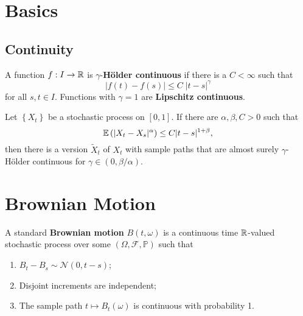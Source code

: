\documentclass[twoside,10pt]{report}
\begin{document}
\tableofcontents


\chapter{Basics}



\section{Continuity}

\begin{defn}[]
A function $f:I\to \mathbb{R}$ is $\gamma$-\textbf{H\"older continuous} if there is a $C < \infty$ such that
\[
|f(t) - f(s)| \leq C \; |t-s|^{\gamma}
\] for all $s,t \in I$. Functions with $\gamma=1$ are \textbf{Lipschitz continuous}.
\end{defn}

\begin{thrm}
	Let $\left\{ X_{t} \right\}$ be a stochastic process on $[0,1]$. If there are $\alpha,\beta,C>0$ such that
	\[
	\mathbb{E} \left(  |X_{t}-X_{s}|^{\alpha}  \right) \leq C |t-s|^{1+\beta},
	\] then there is a version $\tilde{X}_{t}$ of $X_{t}$ with sample paths that are almost surely $\gamma$-H\"older continuous for $\gamma \in (0, \beta/\alpha)$.
\end{thrm}




\chapter{Brownian Motion}

\begin{defn}[]
A standard \textbf{Brownian motion} $B(t,\omega)$ is a continuous time $\mathbb{R}$-valued stochastic process over some $(\Omega,\mathcal{F},\mathbb{P})$ such that
\begin{enumerate}
	\item $B_{t}-B_{s}\sim \mathcal{N}(0, t-s)$;
	\item Disjoint increments are independent;
	\item The sample path $t \mapsto B_{t}(\omega)$ is continuous with probability 1.
\end{enumerate}
\end{defn}
\end{document}
